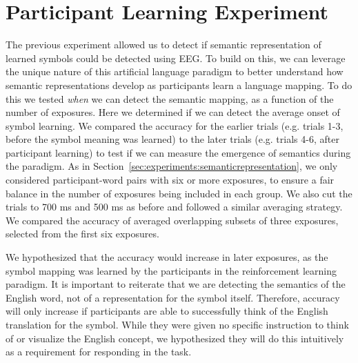 \section{Participant Learning Experiment}
\label{sec:experiments:participantlearning}

The previous experiment allowed us to detect if semantic representation of 
learned symbols could be detected using EEG. To build on this, we can leverage 
the unique nature of this artificial language paradigm to better understand how 
semantic representations develop as participants learn a language mapping. To 
do this we tested \emph{when} we can detect the semantic mapping, as a function 
of the number of exposures.  Here we determined if we can detect the average 
onset of symbol learning. We compared the \tvt accuracy for the earlier trials 
(e.g. trials 1-3, before the symbol meaning was learned) to the later trials 
(e.g. trials 4-6, after participant learning) to test if we can measure the 
emergence of semantics during the paradigm. As in 
Section~\ref{sec:experiments:semanticrepresentation}, we only considered 
participant-word pairs with six or more exposures, to ensure a fair balance in 
the number of exposures being included in each group. We also cut the trials to 
700 ms and 500 ms as before and followed a similar averaging strategy. We 
compared the \tvt accuracy of averaged overlapping subsets of three exposures, 
selected from the first six exposures.

We hypothesized that the \tvt accuracy would increase in later exposures, as 
the symbol mapping was learned by the participants in the reinforcement 
learning paradigm. It is important to reiterate that we are detecting the 
semantics of the English word, not of a representation for the symbol itself.  
Therefore, accuracy will only increase if participants are able to successfully 
think of the English translation for the symbol. While they were given no 
specific instruction to think of or visualize the English concept, we 
hypothesized they will do this intuitively as a requirement for responding in 
the task.
